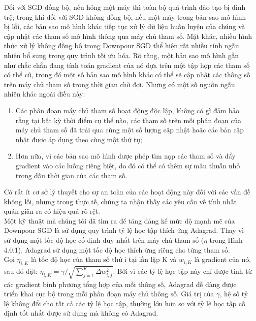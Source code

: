 \documentclass[11pt,a4paper]{article}
\numberwithin{equation}{subsection}
\numberwithin{figure}{subsection}
\numberwithin{table}{subsection}
\begin{document}
Đối với SGD đồng bộ, nếu hỏng một máy thì toàn bộ quá trình đào tạo bị đình trệ; trong khi đối với SGD không đồng bộ, nếu một máy trong bản sao mô hình bị lỗi, các bản sao mô hình khác tiếp tục xử lý dữ liệu huấn luyện của chúng và cập nhật các tham số mô hình thông qua máy chủ tham số. Mặt khác, nhiều hình thức xử lý không đồng bộ trong Downpour SGD thể hiện rất nhiều tính ngẫu nhiên bổ sung trong quy trình tối ưu hóa. Rõ ràng, một bản sao mô hình gần như chắc chắn đang tính toán gradient của nó dựa trên một tập hợp các tham số có thể cũ, trong đó một số bản sao mô hình khác có thể sẽ cập nhật các thông số trên máy chủ tham số trong thời gian chờ đợi. Nhưng có một số nguồn ngẫu nhiên khác ngoài điều này:
\begin{enumerate}[-]
	\item Các phân đoạn máy chủ tham số hoạt động độc lập, không có gì đảm bảo rằng tại bất kỳ thời điểm cụ thể nào, các tham số trên mỗi phân đoạn của máy chủ tham số đã trải qua cùng một số lượng cập nhật hoặc các bản cập nhật được áp dụng theo cùng một thứ tự;
	\item Hơn nữa, vì các bản sao mô hình được phép tìm nạp các tham số và đẩy gradient vào các luồng riêng biệt, do đó có thể có thêm sự mâu thuẫn nhỏ trong dấu thời gian của các tham số.
\end{enumerate}
Có rất ít cơ sở lý thuyết cho sự an toàn của các hoạt động này đối với các vấn đề không lồi, nhưng trong thực tế, chúng ta nhận thấy các yêu cầu về tính nhất quán giãn ra có hiệu quả rõ rệt.\\

Một kỹ thuật mà chúng tôi đã tìm ra để tăng đáng kể mức độ mạnh mẽ của Downpour SGD là sử dụng quy trình tỷ lệ học tập thích ứng Adagrad. Thay vì sử dụng một tốc độ học cố định duy nhất trên máy chủ tham số ($\eta$ trong Hình 4.0.1), Adagrad sử dụng một tốc độ học thích ứng riêng cho từng tham số.\\

Gọi $\eta_{i,K}$ là tốc độ học của tham số thứ i tại lần lặp K và $w_{i,K}$ là gradient của nó, sau đó đặt: $\eta_{i,K} = \gamma / \sqrt{\sum_{j=1}^K \Delta w_{i,j}^2}$. Bởi vì các tỷ lệ học tập này chỉ được tính từ các gradient bình phương tổng hợp của mỗi thông số, Adagrad dễ dàng được triển khai cục bộ trong mỗi phân đoạn máy chủ thông số. Giá trị của $\gamma$, hệ số tỷ lệ không đổi cho tất cả các tỷ lệ học tập, thường lớn hơn so với tỷ lệ học tập cố định tốt nhất được sử dụng mà không có Adagrad.\\
\end{document}
